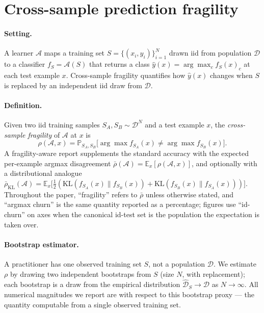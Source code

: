 \section{Cross-sample prediction fragility}
\label{sec:preliminaries}

\paragraph{Setting.}
A learner $\mathcal{A}$ maps a training set
$S = \{(x_i, y_i)\}_{i=1}^{N}$ drawn iid from population $\mathcal{D}$
to a classifier $f_S = \mathcal{A}(S)$ that returns a class
$\hat{y}(x) = \arg\max_c f_S(x)_c$ at each test example $x$.
Cross-sample fragility quantifies how $\hat{y}(x)$ changes when $S$
is replaced by an independent iid draw from $\mathcal{D}$.

\paragraph{Definition.}
Given two iid training samples $S_A, S_B \sim \mathcal{D}^N$ and a
test example $x$, the \emph{cross-sample fragility} of $\mathcal{A}$ at
$x$ is
\begin{equation}
  \rho(\mathcal{A}, x) =
  \mathbb{P}_{S_A, S_B}\!\big[\arg\max f_{S_A}(x) \neq \arg\max f_{S_B}(x)\big].
\end{equation}
A fragility-aware report supplements the standard accuracy with the
expected per-example argmax disagreement
$\bar\rho(\mathcal{A}) = \mathbb{E}_x [\rho(\mathcal{A}, x)]$, and
optionally with a distributional analogue
$\bar\rho_{\mathrm{KL}}(\mathcal{A})
= \mathbb{E}_x \big[\tfrac{1}{2}(\mathrm{KL}(f_{S_A}(x) \| f_{S_B}(x))
                                + \mathrm{KL}(f_{S_B}(x) \| f_{S_A}(x)))\big]$.
Throughout the paper, ``fragility'' refers to $\bar\rho$ unless
otherwise stated, and ``argmax churn'' is the same quantity reported
as a percentage; figures use ``id-churn'' on axes when the canonical
id-test set is the population the expectation is taken over.

\paragraph{Bootstrap estimator.}
A practitioner has one observed training set $S$, not a population
$\mathcal{D}$.  We estimate $\rho$ by drawing two independent
bootstraps from $S$ (size $N$, with replacement); each bootstrap is
a draw from the empirical distribution
$\hat{\mathcal{D}}_S \to \mathcal{D}$ as $N \to \infty$.  All
numerical magnitudes we report are with respect to this bootstrap
proxy --- the quantity computable from a single observed training
set.

